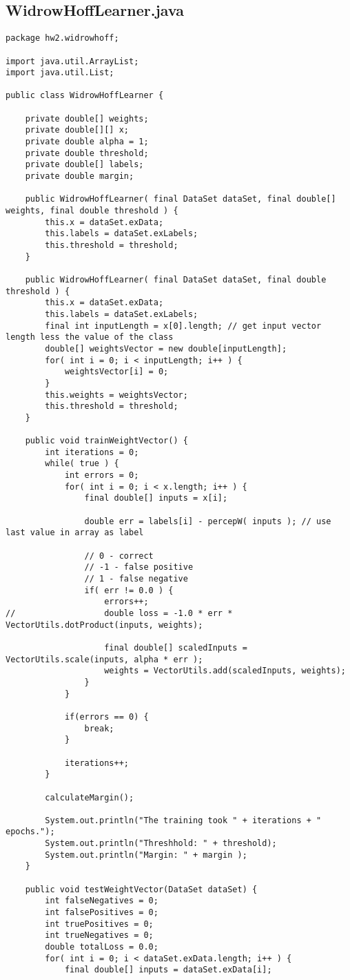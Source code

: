 \subsection{WidrowHoffLearner.java}
\begin{lstlisting}
package hw2.widrowhoff;

import java.util.ArrayList;
import java.util.List;

public class WidrowHoffLearner {

	private double[] weights;
	private double[][] x;
	private double alpha = 1;
	private double threshold;
	private double[] labels;
	private double margin;
	
	public WidrowHoffLearner( final DataSet dataSet, final double[] weights, final double threshold ) {
		this.x = dataSet.exData;
		this.labels = dataSet.exLabels;
		this.threshold = threshold;
	}
	
	public WidrowHoffLearner( final DataSet dataSet, final double threshold ) {
		this.x = dataSet.exData;
		this.labels = dataSet.exLabels;
		final int inputLength = x[0].length; // get input vector length less the value of the class
		double[] weightsVector = new double[inputLength];
		for( int i = 0; i < inputLength; i++ ) {
			weightsVector[i] = 0;
		}
		this.weights = weightsVector;
		this.threshold = threshold;
	}
	
	public void trainWeightVector() {
		int iterations = 0;
		while( true ) {
			int errors = 0;
			for( int i = 0; i < x.length; i++ ) {
				final double[] inputs = x[i];
				
				double err = labels[i] - percepW( inputs ); // use last value in array as label
				
				// 0 - correct
				// -1 - false positive
				// 1 - false negative
				if( err != 0.0 ) {
					errors++;
//					double loss = -1.0 * err * VectorUtils.dotProduct(inputs, weights);
					
					final double[] scaledInputs = VectorUtils.scale(inputs, alpha * err );
					weights = VectorUtils.add(scaledInputs, weights);
				}
			}
			
			if(errors == 0) {
				break;
			}
			
			iterations++;
		}
		
		calculateMargin();
		
		System.out.println("The training took " + iterations + " epochs.");
		System.out.println("Threshhold: " + threshold);
		System.out.println("Margin: " + margin );
	}
	
	public void testWeightVector(DataSet dataSet) {
		int falseNegatives = 0;
		int falsePositives = 0;
		int truePositives = 0;
		int trueNegatives = 0;
		double totalLoss = 0.0;
		for( int i = 0; i < dataSet.exData.length; i++ ) {
			final double[] inputs = dataSet.exData[i];
			

\end{lstlisting}
